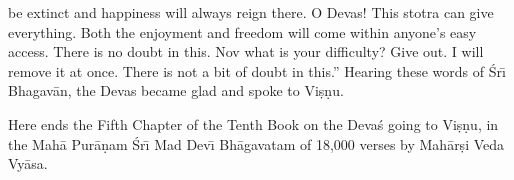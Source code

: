 be extinct and happiness will always reign there. O Devas! This stotra can give everything. Both the enjoyment and freedom will come within anyone's easy access. There is no doubt in this. Nov what is your difficulty? Give out. I will remove it at once. There is not a bit of doubt in this.'' Hearing these words of \'Sr\={\i} Bhagav\=an, the Devas became glad and spoke to Vi\d{s}\d{n}u.

Here ends the Fifth Chapter of the Tenth Book on the Deva\'s going to Vi\d{s}\d{n}u, in the Mah\=a Pur\=a\d{n}am \'Sr\={\i} Mad Dev\={\i} Bh\=agavatam of 18,000 verses by Mah\=ar\d{s}i Veda Vy\=asa.



